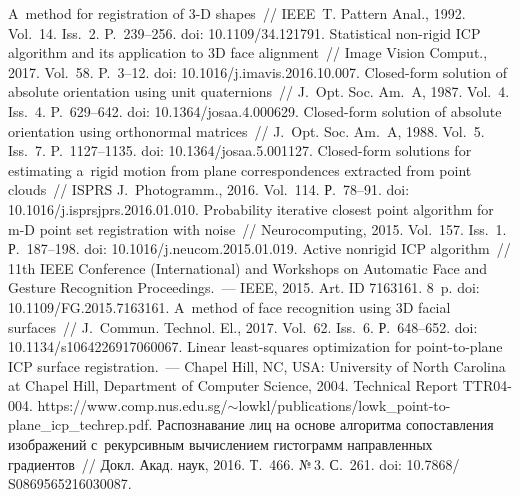 \begin{multicols}{2}
{{\begin{thebibliography}{99}
 A~method for registration of \mbox{3-D} shapes~// 
IEEE~T. Pattern Anal., 1992. Vol.~14. Iss.~2. P.~239--256. doi: 
10.1109/34.121791.
 Statistical non-rigid ICP 
algorithm and its application to 3D face alignment~// Image Vision Comput., 2017. 
Vol.~58. P.~3--12. doi: 10.1016/j.imavis.2016.10.007.
 Closed-form solution of absolute orientation using unit 
quaternions~// J.~Opt. Soc. Am.~A, 1987. Vol.~4. Iss.~4.  
P.~629--642. doi: 10.1364/josaa.4.000629.
 Closed-form solution of absolute 
orientation using orthonormal matrices~// J.~Opt. Soc. Am.~A, 1988. 
Vol.~5. Iss.~7. P.~1127--1135. doi: 10.1364/josaa.5.001127.
 Closed-form solutions for estimating a~rigid motion from 
plane correspondences extracted from point clouds~// ISPRS J.~Photogramm., 
2016. Vol.~114. Р.~78--91. doi: 10.1016/j.isprsjprs.2016.01.010.
 Probability iterative closest point 
algorithm for m-D point set registration with noise~// Neurocomputing, 2015. 
Vol.~157. Iss.~1. Р.~187--198. doi: 10.1016/j.neucom.2015.01.019.
 Active nonrigid ICP algorithm~// 11th 
IEEE Conference (International) and Workshops on Automatic Face and Gesture 
Recognition Proceedings.~--- IEEE, 2015. Art. ID 7163161. 8~p. doi: 
10.1109/FG.2015.7163161.
A~method of face recognition using 3D facial surfaces~// J.~Commun. 
Technol. El., 2017. Vol.~62. Iss.~6. Р.~648--652. doi: 
10.1134/s1064226917060067.
 Linear least-squares optimization for point-to-plane ICP surface 
registration.~--- Chapel Hill, NC, USA: University of 
North Carolina at Chapel Hill, Department of Computer Science, 2004. 
 Technical Report TTR04-004.
 {\sf 
https://www.comp.nus.edu.sg/$\sim$lowkl/\linebreak publications/lowk\_point-to-plane\_icp\_techrep.pdf}.
Распознавание лиц на основе алгоритма сопоставления изображений 
с~рекурсивным вычислением гистограмм направленных градиентов~// 
Докл.  Акад. наук, 2016. Т.~466. №\,3. 
С.~261. doi: 10.7868/ S0869565216030087.



\end{thebibliography}}}
\end{multicols}

